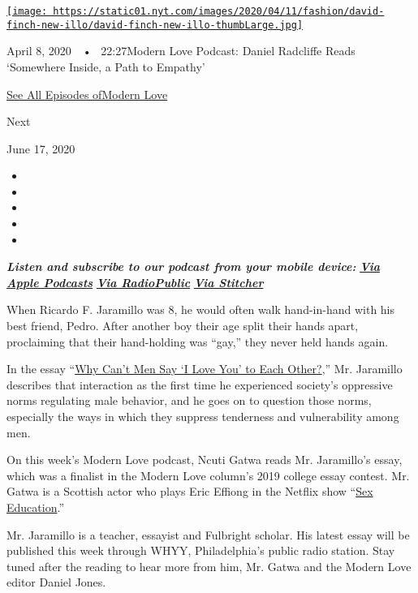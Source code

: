 \href{https://www.nytimes.com/2020/04/08/style/modern-love-podcast-daniel-radcliffe.html?action=click\&module=audio-series-bar\&region=header\&pgtype=Article}{\texttt{[image: https://static01.nyt.com/images/2020/04/11/fashion/david-finch-new-illo/david-finch-new-illo-thumbLarge.jpg]}}

April 8, 2020~~•~ 22:27Modern Love Podcast: Daniel Radcliffe Reads
`Somewhere Inside, a Path to Empathy'

\href{https://www.nytimes.com/column/modern-love-podcast}{See All
Episodes ofModern Love}

Next

June 17, 2020

\begin{itemize}
\item
\item
\item
\item
\item
\end{itemize}

\emph{\textbf{Listen and subscribe to our podcast from your mobile
device:}}
\textbf{\href{https://itunes.apple.com/us/podcast/modern-love/id1065559535?mt=2}{\emph{Via
Apple Podcasts}}} \emph{\textbf{\textbar{}}}
\textbf{\href{https://radiopublic.com/ModernLove}{\emph{Via
RadioPublic}}} \emph{\textbf{\textbar{}}}
\textbf{\href{https://www.stitcher.com/podcast/wbur/modern-love}{\emph{Via
Stitcher}}}

When Ricardo F. Jaramillo was 8, he would often walk hand-in-hand with
his best friend, Pedro. After another boy their age split their hands
apart, proclaiming that their hand-holding was ``gay,'' they never held
hands again.

In the essay
``\href{https://www.nytimes.com/2019/05/10/style/modern-love-college-i-love-you-man-.html}{Why
Can't Men Say `I Love You' to Each Other?},'' Mr. Jaramillo describes
that interaction as the first time he experienced society's oppressive
norms regulating male behavior, and he goes on to question those norms,
especially the ways in which they suppress tenderness and vulnerability
among men.

On this week's Modern Love podcast, Ncuti Gatwa reads Mr. Jaramillo's
essay, which was a finalist in the Modern Love column's 2019 college
essay contest. Mr. Gatwa is a Scottish actor who plays Eric Effiong in
the Netflix show ``\href{https://www.netflix.com/title/80197526}{Sex
Education}.''

Mr. Jaramillo is a teacher, essayist and Fulbright scholar. His latest
essay will be published this week through WHYY, Philadelphia's public
radio station. Stay tuned after the reading to hear more from him, Mr.
Gatwa and the Modern Love editor Daniel Jones.

